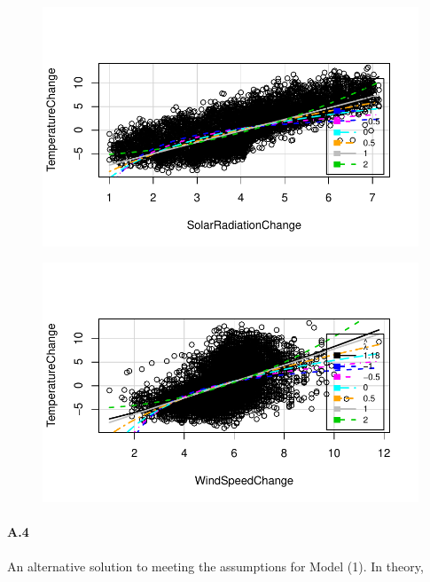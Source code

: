 \documentclass[
  letterpaper,
  DIV=11,
  numbers=noendperiod]{scrartcl}
\let\oldparagraph\paragraph
\renewcommand{\paragraph}[1]{\oldparagraph{#1}\mbox{}}
\begin{document}
\begin{figure}[H]

{\centering \includegraphics{seoul_files/figure-pdf/unnamed-chunk-13-3.pdf}

}

\end{figure}

\begin{figure}[H]

{\centering \includegraphics{seoul_files/figure-pdf/unnamed-chunk-13-4.pdf}

}

\end{figure}

\hypertarget{a4}{%
\paragraph{A.4}\label{a4}}

An alternative solution to meeting the assumptions for Model (1). In
theory,
\end{document}
